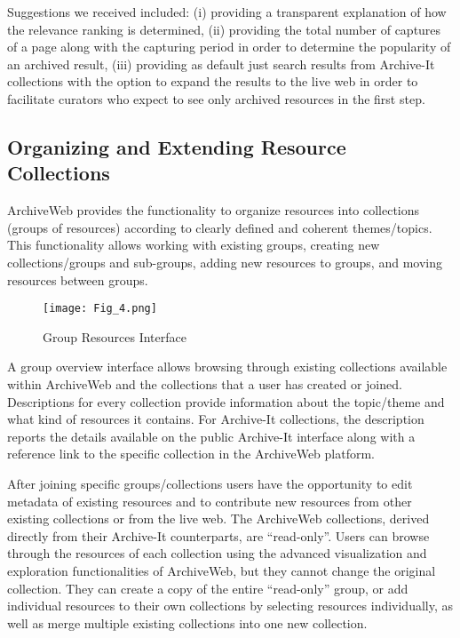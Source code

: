 \documentclass{llncs}
\begin{document}
Suggestions we received included: (i) providing a transparent
explanation of how the relevance ranking is determined, (ii) providing
the total number of captures of a page along with the capturing period
in order to determine the popularity of an archived result, (iii)
providing as default just search results from Archive-It collections
with the option to expand the results to the live web in order to
facilitate curators who expect to see only archived resources in the first step.

\subsection{Organizing and Extending Resource Collections}\label{sec:group}

ArchiveWeb provides the functionality to organize resources into
collections (groups of resources) according to clearly defined and coherent
themes/topics. This functionality allows working with existing groups, creating new
collections/groups and sub-groups, adding new resources to groups, and 
moving resources between groups.

\begin{figure}[htbp]
\texttt{[image: Fig\_4.png]}
\caption{Group Resources Interface}
\label{group}
\end{figure}

A group overview interface allows browsing through existing collections
available within ArchiveWeb and the collections that a user has
created or joined. Descriptions for every collection provide
information about the topic/theme and what kind of resources it
contains. For Archive-It collections, the
description reports the details available on the public Archive-It
interface along with a reference link to the specific collection in the
ArchiveWeb platform.

After joining specific groups/collections users have the opportunity
to edit metadata of existing resources and to contribute new resources
from other existing collections or from the live web. The ArchiveWeb
collections, derived directly from their Archive-It counterparts, are
``read-only''.  Users can browse through the resources of each
collection using the advanced visualization and exploration
functionalities of ArchiveWeb, but they cannot change the original
collection. They can create a copy of the entire ``read-only'' group,
or add individual resources to their own collections by selecting
resources individually, as well as merge multiple existing collections
into one new collection.
\end{document}
